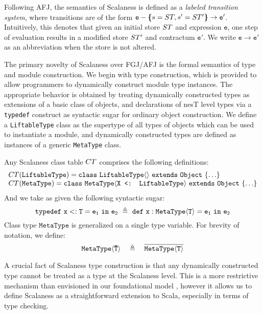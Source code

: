 Following AFJ, the semantics of Scalaness is defined as a \emph{labeled
  transition system}, where transitions are of the form
$\texttt{e} - \textup{\textbf{\{}} s = ST, s' = ST' \textup{\textbf{\}}} \rightarrow \texttt{e}'
$. Intuitively, this denotes that given an initial store $ST$ and
expression $\texttt{e}$, one step of evaluation results in a modified
store $ST'$ and contractum $\texttt{e}'$. We write $\texttt{e}
  \rightarrow \texttt{e}'$ as an abbreviation when the store is not altered.

The primary novelty of Scalaness over FGJ/AFJ is the formal semantics
of type and module construction. We begin with type construction,
which is provided to allow programmers to dynamically construct module
type instances.  The appropriate behavior is obtained by treating
dynamically constructed types as extensions of a basic class of
objects, and declarations of nesT level types via a \texttt{typedef}
construct as syntactic sugar for ordinary object construction. We
define a \texttt{LiftableType} class as the supertype of all types of
objects which can be used to instantiate a module, and dynamically
constructed types are defined as instances of a generic \texttt{MetaType}
class.
\begin{definition}
Any Scalaness class table ${CT}$ comprises the following definitions:
$$
\begin{array}{l}
{CT}(\texttt{LiftableType}) = \mathtt{class\ \texttt{LiftableType}\langle \rangle\ extends\ Object\ \{\ldots \}}\\
{CT}(\texttt{MetaType}) = \mathtt{class\ \texttt{MetaType}\langle \texttt{X <: LiftableType}\rangle\ extends\ Object\ \{ \ldots  \}}
\end{array}
$$
And we take as given the following syntactic sugar:
$$
\jtlet{x}{T}{e_1}{e_2}\ \defeq\ \jdef{x}{\jinst{MetaType}{T}}{e_1}{e_2}
$$
Class type $\texttt{MetaType}$ is generalized on a single type variable. For brevity of 
notation, we define:
$$
\mathtt{\texttt{MetaType}\langle {\ensuremath{\mathtt{\bar{T}}}} \rangle}\quad \triangleq \quad \overline{\mathtt{MetaType\langle T \rangle}}
$$
\end{definition}
A crucial fact of Scalaness type construction is that any dynamically
constructed type cannot be treated as a type at the Scalaness
level. This is a more restrictive mechanism than envisioned in our
foundational model \cite{FramedML,FramedMLworkshop}, however it allows us to define
Scalaness as a straightforward extension to Scala, especially in terms
of type checking.

